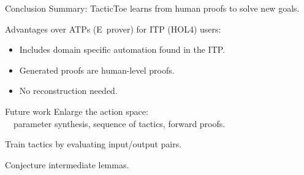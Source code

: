 \documentclass{beamer}
\def\holfour{\textsf{HOL4}\xspace}
\def\eprover{\textsf{E~prover}\xspace}
\begin{document}
\begin{frame}{Conclusion}
Summary: TacticToe learns from human proofs to solve new goals.

\vspace{5mm}

Advantages over ATPs (\eprover) for ITP (\holfour) users:
\begin{itemize}
\item Includes domain specific automation found in the ITP.
\item Generated proofs are human-level proofs.\\
\item No reconstruction needed.\\
\end{itemize}


\end{frame}

\begin{frame}{Future work}
Enlarge the action space:\\ \ \
  parameter synthesis, sequence of tactics, forward proofs.

\vspace{5mm}

Train tactics by evaluating input/output pairs.

\vspace{5mm}

Conjecture intermediate lemmas.
\vspace{5mm}
\end{frame}
 
\end{document}
